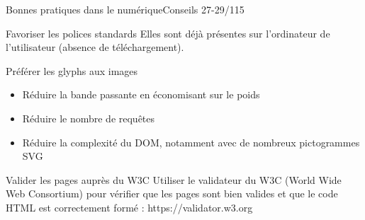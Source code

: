 \begin{frame}{Bonnes pratiques dans le numérique}{Conseils 27-29/115}

\begin{block}{Favoriser les polices standards}
Elles sont déjà présentes sur l’ordinateur de l’utilisateur (absence de téléchargement). 
\end{block}

\begin{block}{Préférer les glyphs aux images}
\begin{itemize}
    \item Réduire la bande passante en économisant sur le poids
    \item Réduire le nombre de requêtes
    \item Réduire la complexité du DOM, notamment avec de nombreux pictogrammes SVG
\end{itemize}
\end{block}

\begin{block}{Valider les pages auprès du W3C}
Utiliser le validateur du W3C (World Wide Web Consortium) pour vérifier que les pages sont bien valides et que le code HTML est correctement formé : https://validator.w3.org
\end{block}

\end{frame}



